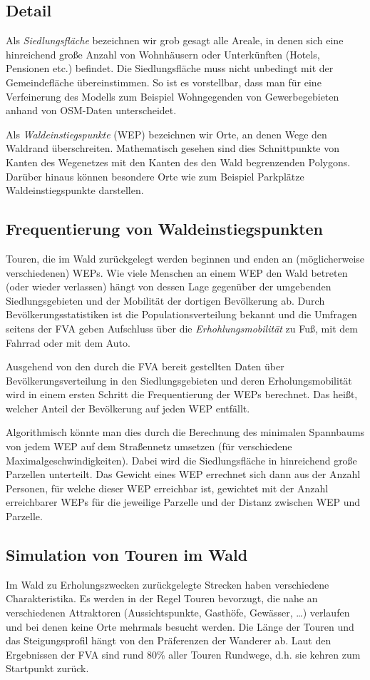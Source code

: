 \documentclass[parskip=half,german]{scrartcl}
\begin{document}
\subsection{Detail}
Als \emph{Siedlungsfläche} bezeichnen wir grob gesagt alle Areale, in denen sich
eine hinreichend große Anzahl von Wohnhäusern oder Unterkünften (Hotels,
Pensionen etc.) befindet. Die Siedlungsfläche muss nicht unbedingt mit der
Gemeindefläche übereinstimmen. So ist es vorstellbar, dass man für eine
Verfeinerung des Modells zum Beispiel Wohngegenden von Gewerbegebieten
anhand von OSM-Daten unterscheidet.

Als \emph{Waldeinstiegspunkte} (WEP) bezeichnen wir Orte, an denen Wege den
Waldrand überschreiten. Mathematisch gesehen sind dies Schnittpunkte von Kanten
des Wegenetzes mit den Kanten des den Wald begrenzenden Polygons. Darüber hinaus
können besondere Orte wie zum Beispiel Parkplätze Waldeinstiegspunkte
darstellen. 
    
      
\subsection*{Frequentierung von Waldeinstiegspunkten}
Touren, die im Wald zurückgelegt werden beginnen und enden an (möglicherweise
verschiedenen) WEPs. Wie viele Menschen an einem WEP den Wald betreten (oder
wieder verlassen) hängt von dessen Lage gegenüber der umgebenden
Siedlungsgebieten und der Mobilität der dortigen Bevölkerung ab. Durch
Bevölkerungsstatistiken ist die Populationsverteilung bekannt und die Umfragen
seitens der FVA geben Aufschluss über die \emph{Erhohlungsmobilität} zu Fuß,
mit dem Fahrrad oder mit dem Auto.

Ausgehend von den durch die FVA bereit gestellten Daten über
Bevölkerungsverteilung in den Siedlungsgebieten und deren Erholungsmobilität
wird in einem ersten Schritt die Frequentierung der WEPs berechnet. Das heißt,
welcher Anteil der Bevölkerung auf jeden WEP entfällt.

Algorithmisch könnte man dies durch die Berechnung des minimalen Spannbaums
von jedem WEP auf dem Straßennetz umsetzen (für verschiedene
Maximalgeschwindigkeiten). Dabei wird die Siedlungsfläche in hinreichend große
Parzellen unterteilt. Das Gewicht eines WEP errechnet sich dann aus der Anzahl
Personen, für welche dieser WEP erreichbar ist, gewichtet mit der Anzahl
erreichbarer WEPs für die jeweilige Parzelle und der Distanz zwischen WEP und
Parzelle.


\subsection*{Simulation von Touren im Wald}
Im Wald zu Erholungszwecken zurückgelegte Strecken haben verschiedene
Charakteristika. Es werden in der Regel Touren bevorzugt, die nahe an
verschiedenen Attraktoren (Aussichtspunkte, Gasthöfe, Gewässer, \dots)
verlaufen und bei denen keine Orte mehrmals besucht werden.
Die Länge der Touren und das Steigungsprofil hängt von den Präferenzen der
Wanderer ab. Laut den Ergebnissen der FVA sind rund 80\% aller Touren Rundwege,
d.h. sie kehren zum Startpunkt zurück.
\end{document}
